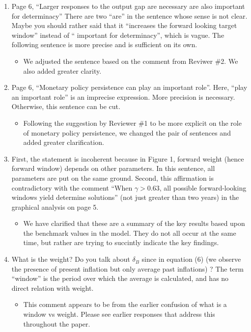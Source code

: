 \documentclass[english,authoryear,12pt]{elsarticle}
\begin{document}
\begin{enumerate}
\begin{itemize}
	\end{itemize}
	\item Page 6, “Larger responses to the output gap are necessary are also important for determinacy” There are two “are” in the sentence whose sense is not clear. Maybe you should rather said that it “increases the forward looking target window” instead of “ important for determinacy”, which is vague. The following sentence is more precise and is sufficient on its own.
	\begin{itemize}
		\item We adjusted the sentence based on the comment from Reviwer \#2. We also added greater clarity. 
	\end{itemize}
	\item Page 6, “Monetary policy persistence can play an important role”. Here, “play an important role” is an imprecise expression. More precision is necessary.
	Otherwise, this sentence can be cut.
	\begin{itemize}
		\item Following the suggestion by Reviewer \#1 to be more explicit on the role of monetary policy persistence, we changed the pair of sentences and added greater clarification. 
	\end{itemize}
	\item First, the statement is incoherent because in Figure 1, forward weight (hence forward window) depends on other parameters. In this sentence, all parameters are put on 	the same ground. Second, this affirmation is contradictory with the comment “When $\gamma > 0.63$, all possible forward-looking windows yield determine solutions” (not just greater than two years) in the graphical analysis on page 5.
	\begin{itemize}
		\item We have clarified that these are a summary of the key results based upon the benchmark values in the model. They do not all occur at the same time, but rather are trying to succintly indicate the key findings.
	\end{itemize}
	\item What is the weight? Do you talk about $\delta_B$ since in equation (6) (we observe the presence of present inflation but only average past inflations) ? The term “window” is the period over which the average is calculated, and has no direct relation with weight.
	\begin{itemize}
		\item This comment appears to be from the earlier confusion of what is a window vs weight. Please see earlier responses that address this throughout the paper.
	\end{itemize}
\end{enumerate}
\end{document}
